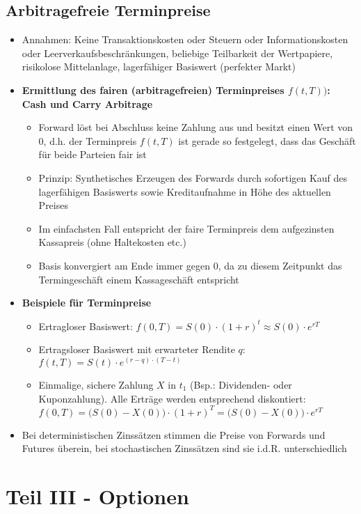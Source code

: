 \subsection{Arbitragefreie Terminpreise}
\begin{itemize}
	\item Annahmen: Keine Transaktionskosten oder Steuern oder Informationskosten oder Leerverkaufsbeschränkungen, beliebige Teilbarkeit der Wertpapiere, risikolose Mittelanlage, lagerfähiger Basiswert (perfekter Markt)
	\item \textbf{Ermittlung des fairen (arbitragefreien) Terminpreises \(f(t,T))\): Cash und Carry Arbitrage}
	\begin{itemize}
		\item Forward löst bei Abschluss keine Zahlung aus und besitzt einen Wert von \(0\), d.h. der Terminpreis \(f(t,T)\) ist gerade so festgelegt, dass das Geschäft für beide Parteien fair ist
		\item Prinzip: Synthetisches Erzeugen des Forwards durch sofortigen Kauf des lagerfähigen Basiswerts sowie Kreditaufnahme in Höhe des aktuellen Preises
		\item Im einfachsten Fall entspricht der faire Terminpreis dem aufgezinsten Kassapreis (ohne Haltekosten etc.)
		\item Basis konvergiert am Ende immer gegen \(0\), da zu diesem Zeitpunkt das Termingeschäft einem Kassageschäft entspricht
	\end{itemize}
	\item \textbf{Beispiele für Terminpreise}
	\begin{itemize}
		\item Ertragloser Basiswert: \(f(0,T) = S(0)\cdot(1+r)^t \approx S(0) \cdot e^{rT}\)
		\item Ertragsloser Basiswert mit erwarteter Rendite \(q\): \(f(t,T) = S(t) \cdot e^{(r-q)\cdot (T-t)}\)
		\item Einmalige, sichere Zahlung \(X\) in \(t_1\) (Bsp.: Dividenden- oder Kuponzahlung). Alle Erträge werden entsprechend diskontiert: \(f(0,T) = \big(S(0)-X(0)\big)\cdot (1+r)^T = \big(S(0)-X(0)\big)\cdot e^{rT}\)
	\end{itemize}
	\item Bei deterministischen Zinssätzen stimmen die Preise von Forwards und Futures überein, bei stochastischen Zinssätzen sind sie i.d.R. unterschiedlich
\end{itemize}



\section{Teil III - Optionen}

